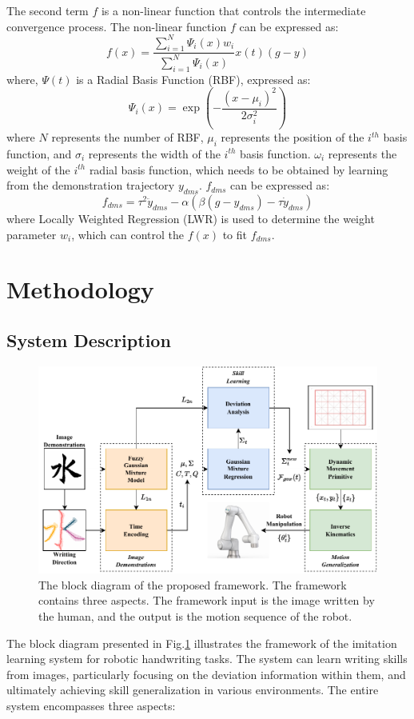 \documentclass[conference]{IEEEtran}
\begin{document}
The second term $f$ is a non-linear function that controls the intermediate convergence process. The non-linear function $f$ can be expressed as:
\begin{equation}
    f(x)=\frac{\sum\limits_{i=1}^{N} \Psi_{i}(x) w_{i}}{\sum\limits_{i=1}^{N} \Psi_{i}(x)}x(t)(g-y)
    \label{eq5}
\end{equation}
where, $\Psi(t)$ is a Radial Basis Function (RBF), expressed as:
\begin{equation}
    \Psi_i(x)= \exp \left(-\frac{\left(x-\mu_i \right)^{2}}{2 \sigma_i^{2}}\right)
\end{equation}
where $N$ represents the number of RBF, $\mu_i$ represents the position of the $i^{th}$ basis function, and $\sigma_i$ represents the width of the $i^{th}$ basis function. $\omega_i$ represents the weight of the $i^{th}$ radial basis function, which needs to be obtained by learning from the demonstration trajectory $y_{dms}$. $f_{dms}$ can be expressed as:
\begin{equation}
    f_{dms} = \tau^2 \ddot y_{dms} - \alpha(\beta (g-y_{dms})-\tau \dot y_{dms})
    \label{eq6}
\end{equation}
where Locally Weighted Regression (LWR) is used to determine the weight parameter $w_{i}$, which can control the $f(x)$ to fit $f_{dms}$.

\section{Methodology}
\subsection{System Description}
\begin{figure}[!t]
    \centering
    \includegraphics[width=6.2in]{./fig/fig1a.pdf}
    \caption{The block diagram of the proposed framework. The framework contains three aspects. The framework input is the image written by the human, and the output is the motion sequence of the robot.}
    \label{fig1}
\end{figure}
The block diagram presented in Fig.\ref{fig1} illustrates the framework of the imitation learning system for robotic handwriting tasks. The system can learn writing skills from images, particularly focusing on the deviation information within them, and ultimately achieving skill generalization in various environments. The entire system encompasses three aspects:
\end{document}
